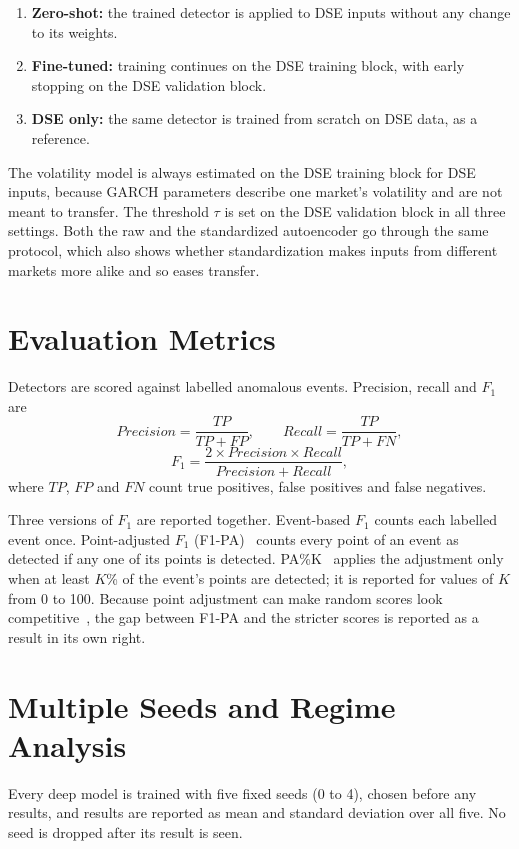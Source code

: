 \begin{enumerate}
    \item \textbf{Zero-shot:} the trained detector is applied to DSE inputs without any
    change to its weights.
    \item \textbf{Fine-tuned:} training continues on the DSE training block, with early
    stopping on the DSE validation block.
    \item \textbf{DSE only:} the same detector is trained from scratch on DSE data, as a
    reference.
\end{enumerate}

The volatility model is always estimated on the DSE training block for DSE inputs, because
GARCH parameters describe one market's volatility and are not meant to transfer. The
threshold $\tau$ is set on the DSE validation block in all three settings. Both the raw and
the standardized autoencoder go through the same protocol, which also shows whether
standardization makes inputs from different markets more alike and so eases transfer.

\section{Evaluation Metrics}
Detectors are scored against labelled anomalous events. Precision, recall and $F_1$ are
\begin{equation}
Precision=\frac{TP}{TP+FP}, \qquad Recall=\frac{TP}{TP+FN},
\end{equation}
\begin{equation}
F_1=\frac{2\times Precision \times Recall}{Precision+Recall},
\end{equation}
where $TP$, $FP$ and $FN$ count true positives, false positives and false negatives.

Three versions of $F_1$ are reported together. Event-based $F_1$ counts each labelled event
once. Point-adjusted $F_1$ (F1-PA)~\cite{xu2018unsupervised} counts every point of an event as
detected if any one of its points is detected. PA\%K~\cite{kim2022towards} applies the
adjustment only when at least $K$\% of the event's points are detected; it is reported
for values of $K$ from 0 to 100. Because point adjustment can make random scores look
competitive~\cite{kim2022towards}, the gap between F1-PA and the stricter scores is
reported as a result in its own right.

\section{Multiple Seeds and Regime Analysis}
Every deep model is trained with five fixed seeds (0 to 4), chosen before any results, and
results are reported as mean and standard deviation over all five. No seed is dropped after
its result is seen.

